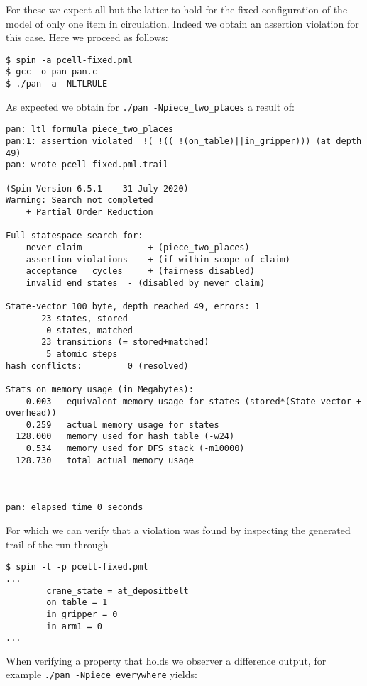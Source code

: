 \documentclass[12pt]{article}
\begin{document}
For these we expect all but the latter to hold for the fixed configuration of the model of only one item in circulation.
Indeed we obtain an assertion violation for this case. Here we proceed as follows:
\begin{verbatim}
$ spin -a pcell-fixed.pml
$ gcc -o pan pan.c
$ ./pan -a -NLTLRULE
\end{verbatim}
As expected we obtain for \texttt{./pan -Npiece\_two\_places} a result of:
\begin{verbatim}
pan: ltl formula piece_two_places
pan:1: assertion violated  !( !(( !(on_table)||in_gripper))) (at depth 49)
pan: wrote pcell-fixed.pml.trail

(Spin Version 6.5.1 -- 31 July 2020)
Warning: Search not completed
	+ Partial Order Reduction

Full statespace search for:
	never claim         	+ (piece_two_places)
	assertion violations	+ (if within scope of claim)
	acceptance   cycles 	+ (fairness disabled)
	invalid end states	- (disabled by never claim)

State-vector 100 byte, depth reached 49, errors: 1
       23 states, stored
        0 states, matched
       23 transitions (= stored+matched)
        5 atomic steps
hash conflicts:         0 (resolved)

Stats on memory usage (in Megabytes):
    0.003	equivalent memory usage for states (stored*(State-vector + overhead))
    0.259	actual memory usage for states
  128.000	memory used for hash table (-w24)
    0.534	memory used for DFS stack (-m10000)
  128.730	total actual memory usage



pan: elapsed time 0 seconds
\end{verbatim}
For which we can verify that a violation was found by inspecting the generated trail of the run
through
\begin{verbatim}
$ spin -t -p pcell-fixed.pml
...
		crane_state = at_depositbelt
		on_table = 1
		in_gripper = 0
		in_arm1 = 0
...
\end{verbatim}
When verifying a property that holds we observer a difference output, for example
\texttt{./pan -Npiece\_everywhere} yields:
\end{document}
